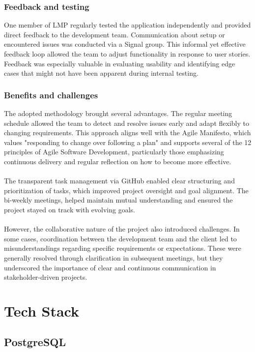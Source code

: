 \documentclass[a4paper,12pt]{report}
\begin{document}
\subsection{Feedback and testing}
One member of LMP regularly tested the application independently and provided direct feedback to the development team. Communication about setup or encountered issues was conducted via a Signal group. This informal yet effective feedback loop allowed the team to adjust functionality in response to user stories. Feedback was especially valuable in evaluating usability and identifying edge cases that might not have been apparent during internal testing. \\

\subsection{Benefits and challenges}
The adopted methodology brought several advantages. The regular meeting schedule allowed the team to detect and resolve issues early and adapt flexibly to changing requirements. This approach aligns well with the Agile Manifesto, which values "responding to change over following a plan" and supports several of the 12 principles of Agile Software Development, particularly those emphasizing continuous delivery and regular reflection on how to become more effective. \parencite{agile-manifesto}\\\\
The transparent task management via GitHub enabled clear structuring and prioritization of tasks, which improved project oversight and goal alignment. The bi-weekly meetings, helped maintain mutual understanding and ensured the project stayed on track with evolving goals.\\\\
However, the collaborative nature of the project also introduced challenges. In some cases, coordination between the development team and the client led to misunderstandings regarding specific requirements or expectations. These were generally resolved through clarification in subsequent meetings, but they underscored the importance of clear and continuous communication in stakeholder-driven projects. 

\chapter{Tech Stack}
\section{PostgreSQL}
\end{document}
